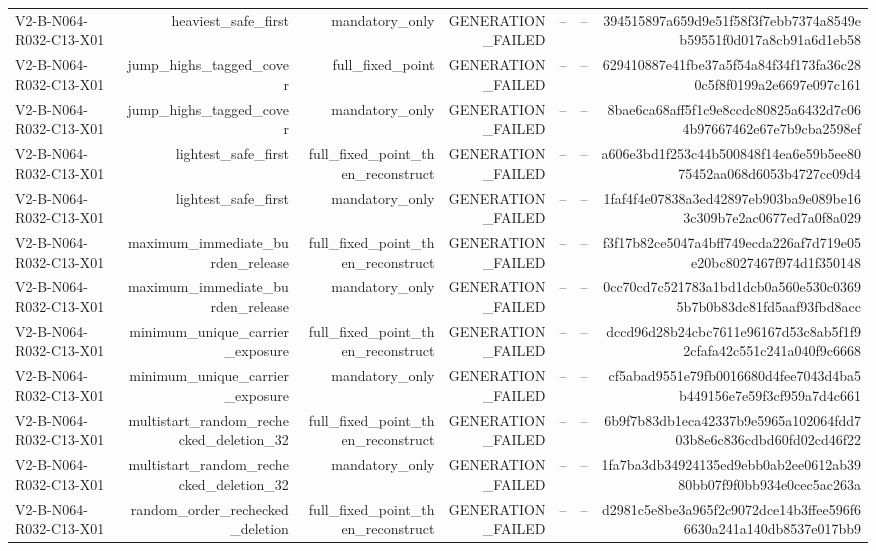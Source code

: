 {\begin{longtable}{lrrrrrr}
V2-B-N064-R032-C13-X01 & heaviest\_safe\_first & mandatory\_only & GENERATION\_FAILED & -- & -- & 394515897a659d9e51f58f3f7ebb7374a8549eb59551f0d017a8cb91a6d1eb58 \\
V2-B-N064-R032-C13-X01 & jump\_highs\_tagged\_cover & full\_fixed\_point & GENERATION\_FAILED & -- & -- & 629410887e41fbe37a5f54a84f34f173fa36c280c5f8f0199a2e6697e097c161 \\
V2-B-N064-R032-C13-X01 & jump\_highs\_tagged\_cover & mandatory\_only & GENERATION\_FAILED & -- & -- & 8bae6ca68aff5f1c9e8ccdc80825a6432d7c064b97667462e67e7b9cba2598ef \\
V2-B-N064-R032-C13-X01 & lightest\_safe\_first & full\_fixed\_point\_then\_reconstruct & GENERATION\_FAILED & -- & -- & a606e3bd1f253c44b500848f14ea6e59b5ee8075452aa068d6053b4727cc09d4 \\
V2-B-N064-R032-C13-X01 & lightest\_safe\_first & mandatory\_only & GENERATION\_FAILED & -- & -- & 1faf4f4e07838a3ed42897eb903ba9e089be163c309b7e2ac0677ed7a0f8a029 \\
V2-B-N064-R032-C13-X01 & maximum\_immediate\_burden\_release & full\_fixed\_point\_then\_reconstruct & GENERATION\_FAILED & -- & -- & f3f17b82ce5047a4bff749ecda226af7d719e05e20bc8027467f974d1f350148 \\
V2-B-N064-R032-C13-X01 & maximum\_immediate\_burden\_release & mandatory\_only & GENERATION\_FAILED & -- & -- & 0cc70cd7c521783a1bd1dcb0a560e530c03695b7b0b83dc81fd5aaf93fbd8acc \\
V2-B-N064-R032-C13-X01 & minimum\_unique\_carrier\_exposure & full\_fixed\_point\_then\_reconstruct & GENERATION\_FAILED & -- & -- & dccd96d28b24cbc7611e96167d53c8ab5f1f92cfafa42c551c241a040f9c6668 \\
V2-B-N064-R032-C13-X01 & minimum\_unique\_carrier\_exposure & mandatory\_only & GENERATION\_FAILED & -- & -- & cf5abad9551e79fb0016680d4fee7043d4ba5b449156e7e59f3cf959a7d4c661 \\
V2-B-N064-R032-C13-X01 & multistart\_random\_rechecked\_deletion\_32 & full\_fixed\_point\_then\_reconstruct & GENERATION\_FAILED & -- & -- & 6b9f7b83db1eca42337b9e5965a102064fdd703b8e6c836cdbd60fd02cd46f22 \\
V2-B-N064-R032-C13-X01 & multistart\_random\_rechecked\_deletion\_32 & mandatory\_only & GENERATION\_FAILED & -- & -- & 1fa7ba3db34924135ed9ebb0ab2ee0612ab3980bb07f9f0bb934e0cec5ac263a \\
V2-B-N064-R032-C13-X01 & random\_order\_rechecked\_deletion & full\_fixed\_point\_then\_reconstruct & GENERATION\_FAILED & -- & -- & d2981c5e8be3a965f2c9072dce14b3ffee596f66630a241a140db8537e017bb9 \\

\end{longtable}}
